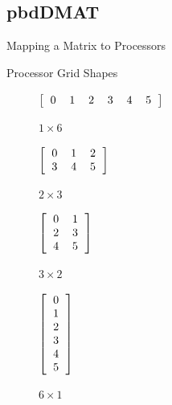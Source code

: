 \subsection{pbdDMAT}
\makesubcontentsslidessec

\begin{frame}{Mapping a Matrix to Processors}
  \begin{block}{Processor Grid Shapes}
    \begin{table}[ht]
      \centering
      \begin{subfigure}[b]{0.23\textwidth}
        \centering
        $\left[\begin{tabular}{llllll}
            0 & 1 & 2 & 3 & 4 & 5
          \end{tabular}\right]$
        \vspace{1.5cm}
        \caption{$1\times 6$}
      \end{subfigure}%
      \begin{subfigure}[b]{0.23\textwidth}
        \centering
        $\left[\begin{tabular}{lll}
            0 & 1 & 2\\
            3 & 4 & 5
          \end{tabular}\right]$
        \caption{$2\times 3$}
      \end{subfigure}%
      \begin{subfigure}[b]{0.23\textwidth}
        \centering
        $\left[\begin{tabular}{ll}
            0 & 1 \\
            2 & 3\\
            4 & 5
          \end{tabular}\right]$
        \caption{$3\times 2$}
      \end{subfigure}
      \begin{subfigure}[b]{0.23\textwidth}
        \centering
        $\left[\begin{tabular}{l}
            0 \\ 1 \\ 2 \\ 3 \\ 4 \\ 5
          \end{tabular}\right]$
        \caption{$6\times 1$}
      \end{subfigure}
      \caption{Processor Grid Shapes with 6 Processors}\label{fig:gridshapes}
    \end{table}
  \end{block}
\end{frame}

